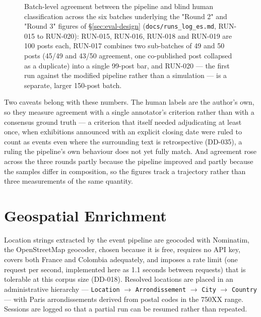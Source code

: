 \documentclass[12pt, a4paper]{report}
\begin{document}
\begin{figure}[htbp]
\centering
{}
\caption{Batch-level agreement between the pipeline and blind human
classification across the six batches underlying the "Round 2" and
"Round 3" figures of \S\ref{sec:eval-design} (\texttt{docs/runs\_log\_es.md},
RUN-015 to RUN-020): RUN-015, RUN-016, RUN-018 and RUN-019 are 100 posts
each, RUN-017 combines two sub-batches of 49 and 50 posts (45/49 and
43/50 agreement, one co-published post collapsed as a duplicate) into a
single 99-post bar, and RUN-020 — the first run against the modified
pipeline rather than a simulation — is a separate, larger 150-post batch.}
\label{fig:eval-batches}
\end{figure}

Two caveats belong with these numbers. The human labels are the author's
own, so they measure agreement with a single annotator's criterion
rather than with a consensus ground truth — a criterion that itself
needed adjudicating at least once, when exhibitions announced with an
explicit closing date were ruled to count as events even where the
surrounding text is retrospective (DD-035), a ruling the pipeline's own
behaviour does not yet fully match. And agreement rose across the three
rounds partly because the pipeline improved and partly because the
samples differ in composition, so the figures track a trajectory rather
than three measurements of the same quantity.

\section{Geospatial Enrichment}
\label{sec:geo}

Location strings extracted by the event pipeline are geocoded with
Nominatim, the OpenStreetMap geocoder, chosen because it is free,
requires no API key, covers both France and Colombia adequately, and
imposes a rate limit (one request per second, implemented here as 1.1
seconds between requests) that is tolerable at this corpus size (DD-018).
Resolved locations are placed in an administrative hierarchy —
\texttt{Location} $\to$ \texttt{Arrondissement} $\to$ \texttt{City}
$\to$ \texttt{Country} — with Paris arrondissements derived from postal
codes in the 750XX range. Sessions are logged so that a partial run can
be resumed rather than repeated.
\end{document}
